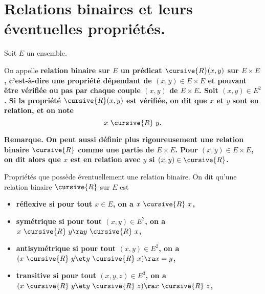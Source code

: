 \documentclass[11pt]{article}
\renewcommand*{\r}{\cursive{R}}
\begin{document}


\thispagestyle{fancy}

\section{Relations binaires et leurs éventuelles propriétés.}

Soit $E$ un ensemble.

\begin{defi}{}{}
    On appelle \bf{relation binaire} sur $E$ un prédicat $\r(x,y)$ sur $E\times E$, c'est-à-dire une propriété dépendant de $(x,y)\in E\times E$ et pouvant être vérifiée ou pas par chaque couple $(x,y)$ de $E\times E$.\n
    Soit $(x,y)\in E^2$. Si la propriété $\r(x,y)$ est vérifiée, on dit que $x$ et $y$ sont \bf{en relation}, et on note
    \begin{equation*}
        x ~\r~ y.
    \end{equation*}
\end{defi}

\bf{Remarque.} On peut aussi définir plus rigoureusement une relation binaire $\r$ comme une partie de $E\times E$. Pour $(x,y)\in E\times E$, on dit alors que $x$ est en relation avec $y$ si $(x,y)\in\r$.

\begin{defi}{Propriétés que possède éventuellement une relation binaire.}{}
    On dit qu'une relation binaire $\r$ sur $E$ est
    \begin{itemize}
        \item \bf{réflexive} si pour tout $x\in E$, on a $x ~\r~ x$,
        \item \bf{symétrique} si pour tout $(x,y)\in E^2$, on a $x ~\r~ y\ra y ~\r~ x$,
        \item \bf{antisymétrique} si pour tout $(x,y)\in E^2$, on a $(x ~\r~ y\et y ~\r~ x)\ra x=y$,
        \item \bf{transitive} si pour tout $(x,y,z)\in E^3$, on a $(x ~\r~ y\et y ~\r~ z)\ra x ~\r~ z$,
    \end{itemize}
\end{defi}
\end{document}
